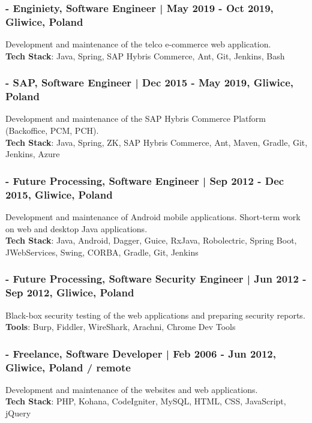 \documentclass[8pt]{extarticle}
\begin{document}
      \subsubsection*{\normalsize{- Enginiety, Software Engineer | May 2019 - Oct 2019, Gliwice, Poland}}
      Development and maintenance of the telco e-commerce web application.\\
      \textbf{Tech Stack}: Java, Spring, SAP Hybris Commerce, Ant, Git, Jenkins, Bash

      \subsubsection*{\normalsize{- SAP, Software Engineer | Dec 2015 - May 2019, Gliwice, Poland}}
      Development and maintenance of the SAP Hybris Commerce Platform (Backoffice, PCM, PCH).\\
      \textbf{Tech Stack}: Java, Spring, ZK, SAP Hybris Commerce, Ant, Maven, Gradle, Git, Jenkins, Azure

      \subsubsection*{\normalsize{- Future Processing, Software Engineer | Sep 2012 - Dec 2015, Gliwice, Poland}}
      Development and maintenance of Android mobile applications. Short-term work on web and desktop Java applications.\\
      \textbf{Tech Stack}: Java, Android, Dagger, Guice, RxJava, Robolectric, Spring Boot, JWebServices,
      Swing, CORBA, Gradle, Git, Jenkins

      \subsubsection*{\normalsize{- Future Processing, Software Security Engineer | Jun 2012 - Sep 2012, Gliwice, Poland}}
      Black-box security testing of the web applications and preparing security reports.\\
      \textbf{Tools}: Burp, Fiddler, WireShark, Arachni, Chrome Dev Tools

      \subsubsection*{\normalsize{- Freelance, Software Developer | Feb 2006 - Jun 2012, Gliwice, Poland / remote}}
      Development and maintenance of the websites and web applications.\\
      \textbf{Tech Stack}: PHP, Kohana, CodeIgniter, MySQL, HTML, CSS, JavaScript, jQuery
\end{document}

